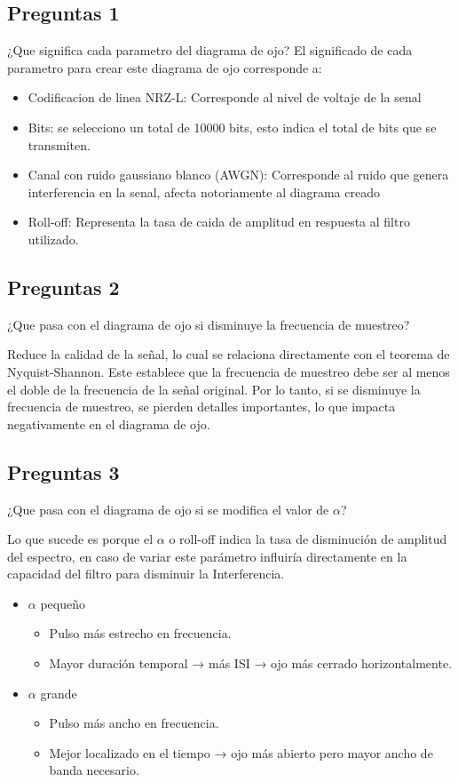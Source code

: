 \documentclass[lettersize,journal]{IEEEtran}
\begin{document}
\subsection{Preguntas 1}
¿Que significa cada parametro del diagrama de ojo?
El significado de cada parametro para crear este diagrama
de ojo corresponde a:
\begin{itemize}
    \item Codificacion de linea NRZ-L: Corresponde al nivel de
voltaje de la senal
    \item Bits: se selecciono un total de 10000 bits, esto indica el total de bits que se transmiten.
    \item Canal con ruido gaussiano blanco (AWGN): Corresponde
al ruido que genera interferencia en la senal, afecta 
notoriamente al diagrama creado
    \item Roll-off: Representa la tasa de caida de amplitud en
respuesta al filtro utilizado.
\end{itemize}

\subsection{Preguntas 2}
¿Que pasa con el diagrama de ojo si disminuye la
frecuencia de muestreo?

Reduce la calidad de la señal, lo cual se relaciona directamente con el teorema de Nyquist-Shannon. Este establece que la frecuencia de muestreo debe ser al menos el doble de la frecuencia de la señal original. Por lo tanto, si se disminuye la frecuencia de muestreo, se pierden detalles importantes, lo que impacta negativamente en el diagrama de ojo.

\subsection{Preguntas 3}
¿Que pasa con el diagrama de ojo si se modifica el
valor de $\alpha$?

Lo que sucede es porque el $\alpha$ o roll-off indica la tasa de disminución
de amplitud del espectro, en caso de variar este parámetro
influiría directamente en la capacidad del filtro para disminuir la 
Interferencia.
\begin{itemize}
    \item $\alpha$ pequeño
    \begin{itemize}
        \item Pulso más estrecho en frecuencia.
        \item Mayor duración temporal → más ISI → ojo más cerrado horizontalmente.
    \end{itemize}
    \item $\alpha$ grande
    \begin{itemize}
        \item Pulso más ancho en frecuencia.
        \item Mejor localizado en el tiempo → ojo más abierto pero mayor ancho de banda necesario.
    \end{itemize}
\end{itemize}
\end{document}
